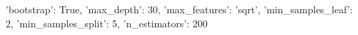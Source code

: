 {'bootstrap': True, 'max_depth': 30, 'max_features': 'sqrt', 'min_samples_leaf': 2, 'min_samples_split': 5, 'n_estimators': 200}